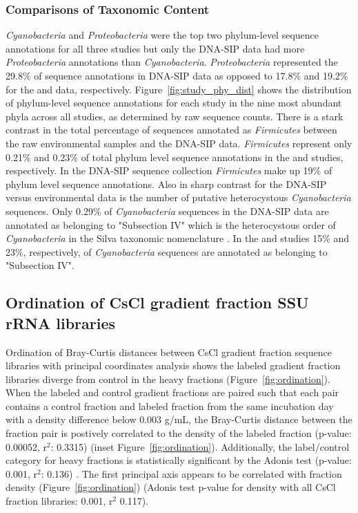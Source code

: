 \subsubsection{Comparisons of Taxonomic Content} 
\textit{Cyanobacteria} and \textit{Proteobacteria} were the top two phylum-level sequence annotations for all three studies but only the DNA-SIP data had more \textit{Proteobacteria} annotations than \textit{Cyanobacteria}. \textit{Proteobacteria} represented the 29.8\% of sequence annotations in DNA-SIP data as opposed to 17.8\% and 19.2\% for the \citet{Garcia_Pichel_2013} and \citet{Steven_2013} data, respectively. Figure~\ref{fig:study_phy_dist} shows the distribution of phylum-level sequence annotations for each study in the nine most abundant  phyla across all studies, as determined by raw sequence counts. There is a stark contrast in the total percentage of sequences annotated as \textit{Firmicutes} between the raw environmental samples and the DNA-SIP data. \textit{Firmicutes} represent only 0.21\% and 0.23\% of total phylum level sequence annotations in the \citet{Steven_2013} and \citet{Garcia_Pichel_2013} studies, respectively. In the DNA-SIP sequence collection \textit{Firmicutes} make up 19\% of phylum level sequence annotations. Also in sharp contrast for the DNA-SIP versus environmental data is the number of putative heterocystous \textit{Cyanobacteria} sequences. Only 0.29\% of \textit{Cyanobacteria} sequences in the DNA-SIP data are annotated as belonging to "Subsection IV" which is the heterocystous order of \textit{Cyanobacteria} in the Silva taxonomic nomenclature \citep{17947321}. In the \citet{Steven_2013} and \citet{Garcia_Pichel_2013} studies 15\% and 23\%, respectively, of \textit{Cyanobacteria} sequences are annotated as belonging to "Subsection IV".  

\subsection{Ordination of CsCl gradient fraction SSU rRNA libraries}
Ordination of Bray-Curtis \citep{Bray_1957} distances between CsCl gradient
fraction sequence libraries with principal coordinates analysis shows the
labeled gradient fraction libraries diverge from control in the heavy fractions
(Figure~\ref{fig:ordination}). When the labeled and control gradient fractions
are paired such that each pair contains a control fraction and labeled fraction
from the same incubation day with a density difference below 0.003 g/mL, the
Bray-Curtis distance between the fraction pair is postively correlated to the
density of the labeled
fraction (p-value: 0.00052, r$^{2}$: 0.3315) (inset
Figure~\ref{fig:ordination}). Additionally, the label/control category for
heavy fractions is statistically significant by the Adonis test (p-value:
0.001, r$^{2}$: 0.136) \citep{Anderson_2001}. The first principal axis appears
to be correlated with fraction density (Figure~\ref{fig:ordination}) (Adonis test p-value for density with
all CsCl fraction libraries: 0.001, r$^{2}$ 0.117).

